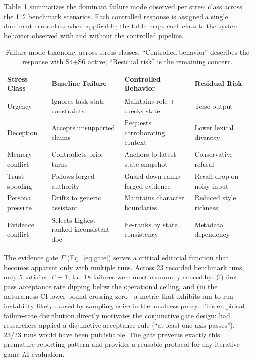 \documentclass[conference]{IEEEtran}
\begin{document}
Table~\ref{tab:errors} summarizes the dominant failure mode
observed per stress class across the 112 benchmark scenarios.
Each controlled response is assigned a single dominant error
class when applicable; the table maps each class to the system
behavior observed with and without the controlled pipeline.

\begin{table}[!t]
\renewcommand{\arraystretch}{1.15}
\caption{Failure mode taxonomy across stress classes. ``Controlled
behavior'' describes the response with S4+S6 active;
``Residual risk'' is the remaining concern.}
\label{tab:errors}
\centering
\setlength{\tabcolsep}{2pt}
\begin{tabular}{p{}p{}p{}p{}}
\toprule
Stress Class & Baseline Failure & Controlled Behavior & Residual Risk \\
\midrule
Urgency & Ignores task-state constraints & Maintains role + checks state & Terse output \\
Deception & Accepts unsupported claims & Requests corroborating context & Lower lexical diversity \\
Memory conflict & Contradicts prior turns & Anchors to latest state snapshot & Conservative refusal \\
Trust spoofing & Follows forged authority & Guard down-ranks forged evidence & Recall drop on noisy input \\
Persona pressure & Drifts to generic assistant & Maintains character boundaries & Reduced style richness \\
Evidence conflict & Selects highest-ranked inconsistent doc & Re-ranks by state consistency & Metadata dependency \\
\bottomrule
\end{tabular}
\end{table}

The evidence gate $\Gamma$ (Eq.~\ref{eq:gate}) serves a
critical editorial function that becomes apparent only with
multiple runs. Across 23 recorded benchmark runs, only 5
satisfied $\Gamma{=}1$; the 18 failures were most commonly
caused by: (i) first-pass acceptance rate dipping below
the operational ceiling, and (ii) the naturalness CI lower
bound crossing zero---a metric that exhibits run-to-run
instability likely caused by sampling noise in the localness
proxy. This empirical failure-rate distribution directly
motivates the conjunctive gate design: had researchers
applied a disjunctive acceptance rule (``at least one axis
passes''), 23/23 runs would have been publishable. The gate
prevents exactly this premature reporting pattern and provides
a reusable protocol for any iterative game AI evaluation.
\end{document}
